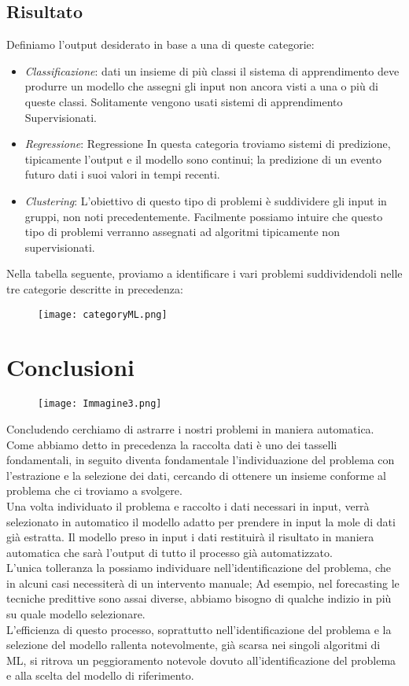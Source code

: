 \documentclass[../tesi.tex]{subfiles}
\begin{document}
\subsection{Risultato}
Definiamo l’output desiderato in base a una di queste categorie:

\begin{itemize}
  \item \textit{Classificazione}: dati un insieme di più classi il sistema di apprendimento deve produrre un modello che assegni gli input non ancora visti a una o più di queste classi. Solitamente vengono usati sistemi di apprendimento Supervisionati.
  \item \textit{Regressione}: Regressione In questa categoria troviamo sistemi di predizione, tipicamente l’output e il modello sono continui; la predizione di un evento futuro dati i suoi valori in tempi recenti.
  \item \textit{Clustering}: L’obiettivo di questo tipo di problemi è suddividere gli input in gruppi, non noti precedentemente. Facilmente possiamo intuire che questo tipo di problemi verranno assegnati ad algoritmi tipicamente non supervisionati.
\end{itemize}

Nella tabella seguente, proviamo a identificare i vari problemi suddividendoli nelle tre categorie descritte in precedenza:
\begin{figure}[htbp]
  \texttt{[image: categoryML.png]}
  \caption{} 
  \end{figure}
  \newpage
\section{Conclusioni}
\begin{figure}[htbp]
  \centering
  \texttt{[image: Immagine3.png]} 
  \end{figure}
Concludendo cerchiamo di astrarre i nostri problemi in maniera automatica.\\
Come abbiamo detto in precedenza la raccolta dati è uno dei tasselli fondamentali, in seguito diventa fondamentale l’individuazione del problema con l’estrazione e la selezione dei dati, cercando di ottenere un insieme conforme al problema che ci troviamo a svolgere.\\
Una volta individuato il problema e raccolto i dati necessari in input, verrà selezionato in automatico il modello adatto per prendere in input la mole di dati già estratta. Il modello preso in input i dati restituirà il risultato in maniera automatica che sarà l’output di tutto il processo già automatizzato.\\
L’unica tolleranza la possiamo individuare nell’identificazione del problema, che in alcuni casi necessiterà di un intervento manuale; Ad esempio, nel forecasting le tecniche predittive sono assai diverse, abbiamo bisogno di qualche indizio in più su quale modello selezionare.\\
L’efficienza di questo processo, soprattutto nell’identificazione del problema e la selezione del modello rallenta notevolmente, già scarsa nei singoli algoritmi di ML, si ritrova un peggioramento notevole dovuto all’identificazione del problema e alla scelta del modello di riferimento.
\end{document}
